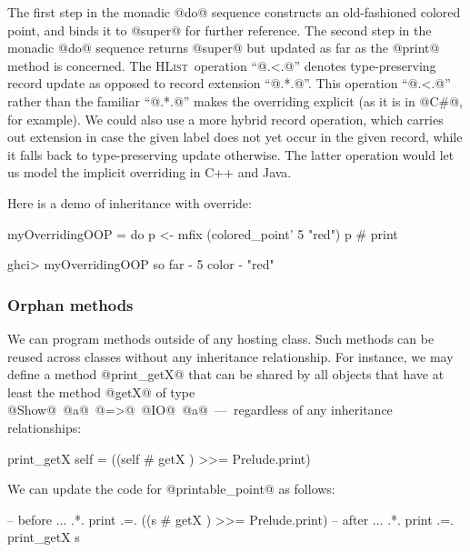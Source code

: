 \documentclass{jfp}
\newcommand{\HList}{\textsc{HList}}
\begin{document}
The first step in the monadic @do@ sequence constructs an
old-fashioned colored point, and binds it to @super@ for further
reference. The second step in the monadic @do@ sequence returns
@super@ but updated as far as the @print@ method is concerned. The
\HList\ operation ``@.<.@'' denotes type-preserving record update as
opposed to record extension ``@.*.@''. This operation ``@.<.@'' rather
than the familiar ``@.*.@'' makes the overriding explicit (as it is in
@C#@, for example). We could also use a more hybrid record operation,
which carries out extension in case the given label does not yet occur
in the given record, while it falls back to type-preserving update
otherwise. The latter operation would let us model the implicit
overriding in C++ and Java.

Here is a demo of inheritance with override:

\begin{code}
 myOverridingOOP =
   do
      p  <- mfix (colored_point' 5 "red")
      p  # print
\end{code}

\begin{code}
 ghci> myOverridingOOP
 so far - 5
 color  - "red"
\end{code}






\subsubsection{Orphan methods}

We can program methods outside of any hosting class. Such methods can
be reused across classes without any inheritance relationship. For
instance, we may define a method @print_getX@ that can be shared by
all objects that have at least the method @getX@ of type
@Show@~@a@~@=>@~@IO@~@a@~---~regardless of any inheritance
relationships:

\begin{code}
 print_getX self = ((self # getX ) >>= Prelude.print)
\end{code}

We can update the code for @printable_point@ as follows:

\begin{code}
 -- before
 ... .*. print    .=. ((s # getX ) >>= Prelude.print)
 -- after
 ... .*. print    .=. print_getX s
\end{code}
\end{document}
